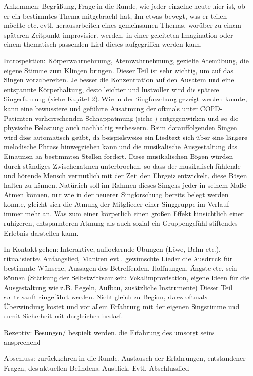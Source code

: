 Ankommen: 
Begrüßung, Frage in die Runde, wie jeder einzelne heute hier ist, ob er ein bestimmtes Thema mitgebracht hat, ihn etwas bewegt, was er teilen möchte etc. evtl. herausarbeiten eines gemeinsamen Themas, worüber zu einem späteren Zeitpunkt improvisiert werden, in einer geleiteten Imagination oder einem thematisch passenden Lied dieses aufgegriffen werden kann.

Introspektion: 
Körperwahrnehmung, Atemwahrnehmung, gezielte Atemübung, die eigene Stimme zum Klingen bringen. Dieser Teil ist sehr wichtig, um auf das Singen vorzubereiten. Je besser die Konzentration auf den Ausatem und eine entspannte Körperhaltung, desto leichter und lustvoller wird die spätere Singerfahrung (siehe Kapitel 2). Wie in der Singforschung gezeigt werden konnte, kann eine bewusstere und geführte Ausatmung der oftmals unter COPD-Patienten vorherrschenden Schnappatmung (siehe \label{copd}) entgegenwirken und so die physische Belastung auch nachhaltig verbessern. Beim darauffolgenden Singen wird dies automatisch geübt, da beispielsweise ein Liedtext sich über eine längere melodische Phrase hinwegziehen kann und die musikalische Ausgestaltung das Einatmen an bestimmten Stellen fordert. Diese musikalischen Bögen würden durch ständiges Zwischenatmen unterbrochen, so dass der musikalisch fühlende und hörende Mensch vermutlich mit der Zeit den Ehrgeiz entwickelt, diese Bögen halten zu können. Natürlich soll im Rahmen dieses Singens jeder in seinem Maße Atmen können, nur wie in der neueren Singforschung bereits belegt werden konnte, gleicht sich die Atmung der Mitglieder einer Singgruppe im Verlauf immer mehr an. Was zum einen körperlich einen großen Effekt hinsichtlich einer ruhigeren, entspannteren Atmung als auch sozial ein Gruppengefühl stiftendes Erlebnis darstellen kann.

In Kontakt gehen: 
Interaktive, auflockernde Übungen (Löwe, Bahn etc.), ritualisiertes Anfangslied, Mantren evtl. gewünschte Lieder die Ausdruck für bestimmte Wünsche, Aussagen des Betreffenden, Hoffnungen, Ängste etc. sein können
(Stärkung der Selbstwirksamkeit: Vokalimprovisation, eigene Ideen für die Ausgestaltung wie z.B. Regeln, Aufbau, zusätzliche Instrumente) Dieser Teil sollte sanft eingeführt werden. Nicht gleich zu Beginn, da es oftmals Überwindung kostet und vor allem Erfahrung mit der eigenen Singstimme und somit Sicherheit mit dergleichen bedarf.

Rezeptiv: 
Besungen/ bespielt werden, die Erfahrung des umsorgt seins ansprechend

Abschluss: 
zurückkehren in die Runde. Austausch der Erfahrungen, entstandener Fragen, des aktuellen Befindens. Ausblick, Evtl. Abschlusslied


